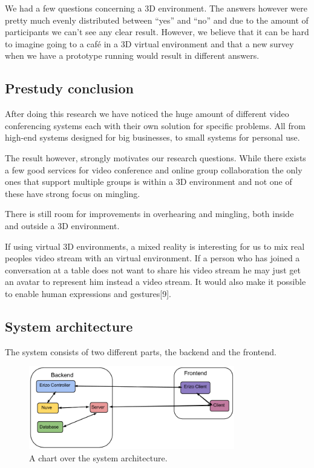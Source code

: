 \documentclass[12pt, titlepage]{article}
\begin{document}
We had a few questions concerning a 3D environment. The answers however were pretty much evenly distributed between “yes” and “no” and due to the amount of participants we can’t see any clear result. However, we believe that it can be hard to imagine going to a café in a 3D virtual environment and that a new survey when we have a prototype running would result in different answers.
\subsection{Prestudy conclusion}
After doing this research we have noticed the huge amount of different video conferencing systems each with their own solution for specific problems. All from high-end systems designed for big businesses, to small systems for personal use.

The result however, strongly motivates our research questions. While there exists a few good services for video conference and online group collaboration the only ones that support multiple groups is within a 3D environment and not one of these have strong focus on mingling.

There is still room for improvements in overhearing and mingling, both inside and outside a 3D environment.

If using virtual 3D environments, a mixed reality is interesting for us to mix real peoples video stream with an virtual environment. If a person who has joined a conversation at a table does not want to share his video stream he may just get an avatar to represent him instead a video stream. It would also make it possible to enable human expressions and gestures[9].
\subsection{System architecture}
The system consists of two different parts, the backend and the frontend.
\begin{figure}[H]
  \centering
	\includegraphics[width=0.8\textwidth,keepaspectratio]{systemarchitecture.png}
  \caption{A chart over the system architecture.}
\end{figure}
\end{document}
